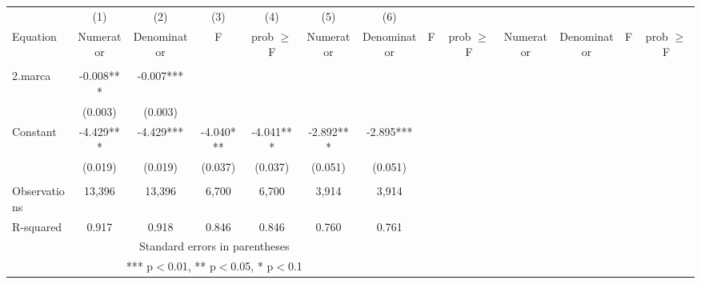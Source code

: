 \begin{tabular}{lcccccccccccc} \hline
	& (1) & (2) & (3) & (4) & (5) & (6) \\
Equation&Numerator&Denominator&F&prob $\geq$ F&Numerator&Denominator&F&prob $\geq$ F&Numerator&Denominator&F&prob $\geq$ F \\ \hline
	&  &  &  &  &  &  \\
	2.marca & -0.008*** & -0.007*** &  &  &  &  \\
	& (0.003) & (0.003) &  &  &  &  \\

	Constant & -4.429*** & -4.429*** & -4.040*** & -4.041*** & -2.892*** & -2.895*** \\
	& (0.019) & (0.019) & (0.037) & (0.037) & (0.051) & (0.051) \\
	&  &  &  &  &  &  \\
	Observations & 13,396 & 13,396 & 6,700 & 6,700 & 3,914 & 3,914 \\
	R-squared & 0.917 & 0.918 & 0.846 & 0.846 & 0.760 & 0.761 \\ \hline
	\multicolumn{7}{c}{ Standard errors in parentheses} \\
	\multicolumn{7}{c}{ *** p$<$0.01, ** p$<$0.05, * p$<$0.1} \\
\end{tabular}